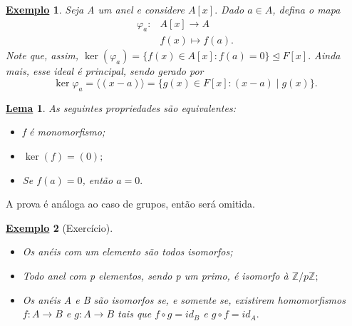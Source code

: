 \documentclass{article}
\newtheorem*{lemma*}{\underline{Lema}}
\newtheorem{example}{\underline{Exemplo}}
\begin{document}
\begin{example}
  Seja A um anel e considere \(A[x].\) Dado \(a\in A\), defina o mapa
 \begin{align*}
  \varphi_{a}:&A[x]\rightarrow A\\
              &f(x)\mapsto f(a).
 \end{align*}
 Note que, assim, \(\ker{(\varphi_{a})} = \{f(x)\in A[x]: f(a) = 0\} \trianglelefteq F[x].\) Ainda mais, esse ideal é principal, sendo gerado por 
  \[
    \ker{\varphi_{a}} = \langle (x-a) \rangle = \{g(x)\in F[x]: (x-a)\mid g(x)\}.
  \]
\end{example}
\begin{lemma*}
  As seguintes propriedades são equivalentes:
  \begin{itemize}
    \item[1)] f é monomorfismo;
    \item[2)] \(\ker{(f)} = (0);\)
    \item[3)] Se \(f(a) = 0\), então \(a=0.\)
  \end{itemize}
\end{lemma*}
A prova é análoga ao caso de grupos, então será omitida.
\begin{example}[Exercício]
  \begin{itemize}
    \item[1)] Os anéis com um elemento são todos isomorfos;
    \item[2)] Todo anel com p elementos, sendo p um primo, é isomorfo à \(\mathbb{Z}/p \mathbb{Z};\)
    \item[3)] Os anéis A e B são isomorfos se, e somente se, existirem homomorfismos
      \(f:A\rightarrow B\) e \(g:A\rightarrow B\) tais que \(f\circ{g}=id_{B}\) e \(g\circ{f} = id_{A}.\)
  \end{itemize} 
\end{example}
\end{document}
